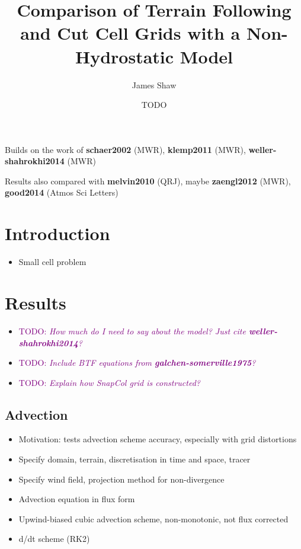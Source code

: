 \documentclass[a4paper]{article}
\title{Comparison of Terrain Following and Cut Cell Grids with a Non-Hydrostatic Model}
\author{James Shaw}
\date{TODO}
\begin{document}
\newcommand{\TODO}[1]{\textcolor{purple}{TODO: \emph{#1}}}
\newcommand{\textcite}[1]{\textbf{#1}}

\maketitle

Builds on the work of \textcite{schaer2002} (MWR), \textcite{klemp2011} (MWR), \textcite{weller-shahrokhi2014} (MWR)

Results also compared with \textcite{melvin2010} (QRJ), maybe \textcite{zaengl2012} (MWR), \textcite{good2014} (Atmos Sci Letters)

\section{Introduction}

\begin{itemize}
	\item Small cell problem
\end{itemize}

\section{Results}
\begin{itemize}
	\item \TODO{How much do I need to say about the model?  Just cite \textcite{weller-shahrokhi2014}?}
	\item \TODO{Include BTF equations from \textcite{galchen-somerville1975}?}
	\item \TODO{Explain how SnapCol grid is constructed?}
\end{itemize}

\subsection{Advection}
\begin{itemize}
	\item Motivation: tests advection scheme accuracy, especially with grid distortions
	\item Specify domain, terrain, discretisation in time and space, tracer
	\item Specify wind field, projection method for non-divergence
	\item Advection equation in flux form
	\item Upwind-biased cubic advection scheme, non-monotonic, not flux corrected
	\item d/dt scheme (RK2)
\end{itemize}
\end{document}
